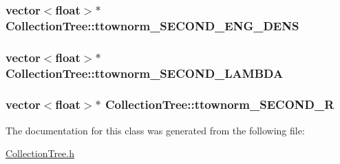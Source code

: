 \subsubsection[{\texorpdfstring{ttownorm\+\_\+\+S\+E\+C\+O\+N\+D\+\_\+\+E\+N\+G\+\_\+\+D\+E\+NS}{ttownorm_SECOND_ENG_DENS}}]{\setlength{\rightskip}{0pt plus 5cm}vector$<$float$>$$\ast$ Collection\+Tree\+::ttownorm\+\_\+\+S\+E\+C\+O\+N\+D\+\_\+\+E\+N\+G\+\_\+\+D\+E\+NS}\hypertarget{classCollectionTree_a765e33cc78b7f9bda46010bd5bac3a57}{}\label{classCollectionTree_a765e33cc78b7f9bda46010bd5bac3a57}
\subsubsection[{\texorpdfstring{ttownorm\+\_\+\+S\+E\+C\+O\+N\+D\+\_\+\+L\+A\+M\+B\+DA}{ttownorm_SECOND_LAMBDA}}]{\setlength{\rightskip}{0pt plus 5cm}vector$<$float$>$$\ast$ Collection\+Tree\+::ttownorm\+\_\+\+S\+E\+C\+O\+N\+D\+\_\+\+L\+A\+M\+B\+DA}\hypertarget{classCollectionTree_a69228da169909f6ff28d67b3b6c2ef8b}{}\label{classCollectionTree_a69228da169909f6ff28d67b3b6c2ef8b}
\subsubsection[{\texorpdfstring{ttownorm\+\_\+\+S\+E\+C\+O\+N\+D\+\_\+R}{ttownorm_SECOND_R}}]{\setlength{\rightskip}{0pt plus 5cm}vector$<$float$>$$\ast$ Collection\+Tree\+::ttownorm\+\_\+\+S\+E\+C\+O\+N\+D\+\_\+R}\hypertarget{classCollectionTree_a7944e9cd9b4c459ef85d907438a92ed4}{}\label{classCollectionTree_a7944e9cd9b4c459ef85d907438a92ed4}


The documentation for this class was generated from the following file\+:\begin{DoxyCompactItemize}
\item 
\hyperlink{CollectionTree_8h}{Collection\+Tree.\+h}\end{DoxyCompactItemize}
